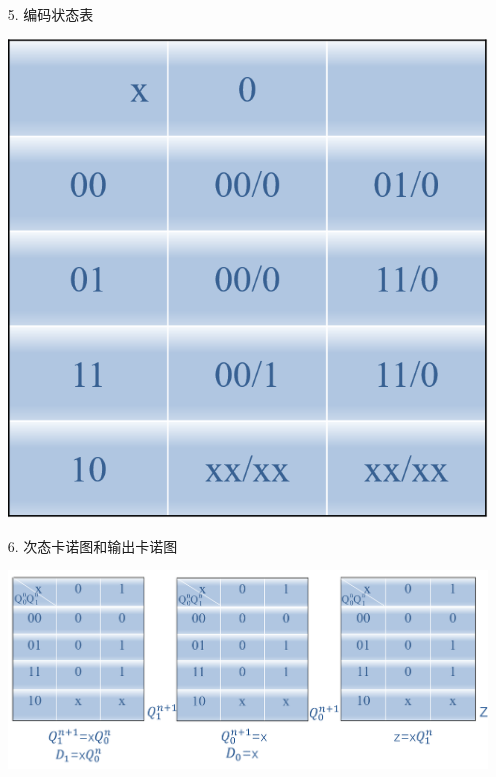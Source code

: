 \documentclass[UTF8]{ctexart}
\begin{document}
\begin{enumerate}
\begin{itemize}
\begin{center}
                        \label{fig:label}
                    \end{center}
              \item [5.] 编码状态表              \\
                    \begin{center}
                        \includegraphics[scale = 0.6]{5.png}
                        \label{fig:label}
                    \end{center}
              \item [6.] 次态卡诺图和输出卡诺图            \\
                    \begin{center}
                        \includegraphics[scale = 0.6]{6.png}
                        \label{fig:label}
                    \end{center}

\end{itemize}
\end{enumerate}
\end{document}
